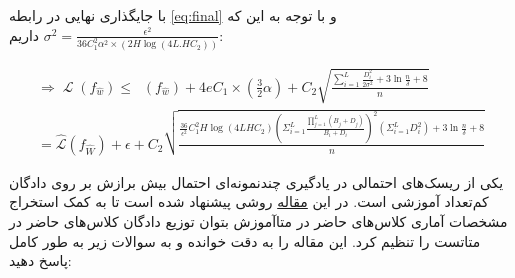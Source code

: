 \documentclass{article}
\DeclareMathOperator{\Lossh}{\hat{\mathcal{L}}}
\DeclareMathOperator{\Loss}{\mathcal{L}}
\begin{document}
\begin{enumerate}
با جایگذاری نهایی در رابطه 
\ref{eq:final}
و با توجه به این که
$\sigma^2 = \frac
{\epsilon^2}
{36C^2_1 \alpha^2 \times (2H \log (4L.HC_2))}$
داریم:

\begin{subequations}
\begin{alignat}{2}
    \Rightarrow
    \Loss(f_{\hat{w}}) \leq \Lossh(f_{\hat{w}}) + 
    4e C_1 \times (\frac{3}{2} \alpha)  +  C_2 \sqrt{\frac
    {\sum_{i=1}^L \frac{D_i^2}{2\sigma^2} + 3 \ln {\frac{n}{\delta}} + 8}
    {n}} \\ = \hat{\mathcal{L}}(f_{\hat{W}}) + \epsilon + C_2\sqrt{\frac{\frac{36}{\epsilon^2}C_1^{2}H\log{(4LHC_2)}(\Sigma^{L}_{i = 1}\frac{\prod^{L}_{j = 1}(B_j + D_j)}{B_i + D_i})^2(\Sigma^{L}_{i = 1}D_i^2) + 3\ln \frac{n}{\delta} + 8}{n}}
\end{alignat}
\end{subequations}

\end{enumerate}
\fi

یکی از ریسک‌های احتمالی در یادگیری چندنمونه‌ای احتمال بیش برازش بر روی دادگان کم‌تعداد آموزشی است. در این
\href{https://arxiv.org/abs/2101.06395}{مقاله}
روشی پیشنهاد شده است تا به کمک استخراج مشخصات آماری کلاس‌های حاضر در متاآموزش بتوان توزیع دادگان کلاس‌های حاضر در متاتست را تنظیم کرد. این مقاله را به دقت خوانده و به سوالات زیر به طور کامل پاسخ دهید:
\end{document}
